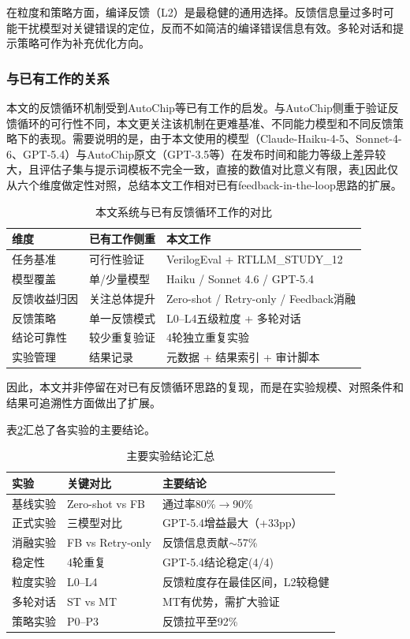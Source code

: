 在粒度和策略方面，编译反馈（L2）是最稳健的通用选择。反馈信息量过多时可能干扰模型对关键错误的定位，反而不如简洁的编译错误信息有效。多轮对话和提示策略可作为补充优化方向。

\subsubsection*{与已有工作的关系}
本文的反馈循环机制受到AutoChip\cite{autochip}等已有工作的启发。与AutoChip侧重于验证反馈循环的可行性不同，本文更关注该机制在更难基准、不同能力模型和不同反馈策略下的表现。需要说明的是，由于本文使用的模型（Claude-Haiku-4-5、Sonnet-4-6、GPT-5.4）与AutoChip原文（GPT-3.5等）在发布时间和能力等级上差异较大，且评估子集与提示词模板不完全一致，直接的数值对比意义有限，表\ref{tab:autochip_compare}因此仅从六个维度做定性对照，总结本文工作相对已有feedback-in-the-loop思路的扩展。

\begin{table}[htbp]
\centering
\caption{本文系统与已有反馈循环工作的对比}
\label{tab:autochip_compare}
\begin{tabular}{lll}
\toprule
维度 & 已有工作侧重 & 本文工作 \\
\midrule
任务基准 & 可行性验证 & VerilogEval + RTLLM\_STUDY\_12 \\
模型覆盖 & 单/少量模型 & Haiku / Sonnet 4.6 / GPT-5.4 \\
反馈收益归因 & 关注总体提升 & Zero-shot / Retry-only / Feedback消融 \\
反馈策略 & 单一反馈模式 & L0--L4五级粒度 + 多轮对话 \\
结论可靠性 & 较少重复验证 & 4轮独立重复实验 \\
实验管理 & 结果记录 & 元数据 + 结果索引 + 审计脚本 \\
\bottomrule
\end{tabular}
\end{table}

因此，本文并非停留在对已有反馈循环思路的复现，而是在实验规模、对照条件和结果可追溯性方面做出了扩展。

表\ref{tab:conclusion_summary}汇总了各实验的主要结论。

\begin{table}[htbp]
\centering
\caption{主要实验结论汇总}
\label{tab:conclusion_summary}
\begin{tabular}{lll}
\toprule
实验 & 关键对比 & 主要结论 \\
\midrule
基线实验 & Zero-shot vs FB & 通过率80\%$\rightarrow$90\% \\
正式实验 & 三模型对比 & GPT-5.4增益最大（+33pp） \\
消融实验 & FB vs Retry-only & 反馈信息贡献$\sim$57\% \\
稳定性 & 4轮重复 & GPT-5.4结论稳定(4/4) \\
粒度实验 & L0--L4 & 反馈粒度存在最佳区间，L2较稳健 \\
多轮对话 & ST vs MT & MT有优势，需扩大验证 \\
策略实验 & P0--P3 & 反馈拉平至92\% \\
\bottomrule
\end{tabular}
\end{table}

